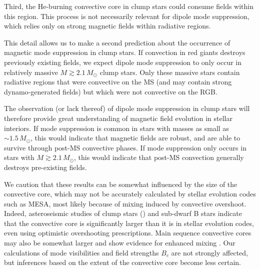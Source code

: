 Third, the He-burning convective core in clump stars could consume fields within this region. This process is not necessarily relevant for dipole mode suppression, which relies only on strong magnetic fields within radiative regions. 

This detail allows us to make a second prediction about the occurrence of magnetic mode suppression in clump stars. If convection in red giants destroys previously existing fields, we expect dipole mode suppression to only occur in relatively massive $M \gtrsim 2.1 \, M_\odot$ clump stars. Only these massive stars contain radiative regions that were convective on the MS (and may contain strong dynamo-generated fields) but which were not convective on the RGB. 

The observation (or lack thereof) of dipole mode suppression in clump stars will therefore provide great understanding of magnetic field evolution in stellar interiors. If mode suppression is common in stars with masses as small as $\sim \! 1.5 \, M_\odot$, this would indicate that magnetic fields are robust, and are able to survive through post-MS convective phases. If mode suppression only occurs in stars with $M \gtrsim 2.1 \, M_\odot$, this would indicate that post-MS convection generally destroys pre-existing fields. 

We caution that these results can be somewhat influenced by the size of the convective core, which may not be accurately calculated by stellar evolution codes such as MESA, most likely because of mixing induced by convective overshoot. Indeed, asteroseismic studies of clump stars (\cite{montalban_2013,stello_2013,mosser_2014,bossini_2015,constantino_2015}) and sub-dwarf B stars \citep{vangrootel_2010a,vangrootel_2010b,charpinet_2011,Schindler_2015} indicate that the convective core is significantly larger than it is in stellar evolution codes, even using optimistic overshooting prescriptions. Main sequence convective cores may also be somewhat larger and show evidence for enhanced mixing \citep{moravveji_2015}.  Our calculations of mode visibilities and field strengths $B_c$ are not strongly affected, but inferences based on the extent of the convective core become less certain.
    
    